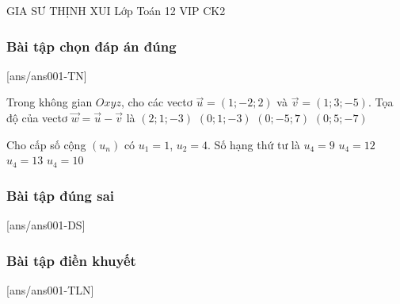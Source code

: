 
\def\toanlop{12}
\def\thoigian{50}
\def\namhoc{2025 - 2026}

\begin{dethi}
	{GIA SƯ THỊNH XUI}
	{Lớp Toán 12 VIP}
	{CK2}
\end{dethi}

\subsubsection{Bài tập chọn đáp án đúng}
\setcounter{ex}{0}
[ans/ans001-TN]

\begin{ex}%
	Trong không gian $Oxyz$, cho các vectơ $\vec{u}=(1;-2;2)$ và $\vec{v}=(1;3;-5)$. Tọa độ của vectơ $\vec{w}=\vec{u}-\vec{v}$ là
	\choice
	{$(2;1;-3)$}
	{$(0;1;-3)$}
	{\True $(0;-5;7)$}
	{$(0;5;-7)$}
\end{ex}

\begin{ex}%
	Cho cấp số cộng $(u_n)$ có $u_1=1$, $u_2=4$. Số hạng thứ tư là
	\choice
	{$u_4=9$}
	{$u_4=12$}
	{$u_4=13$}
	{\True $u_4=10$}
\end{ex}


\subsubsection{Bài tập đúng sai}
\setcounter{ex}{0}
[ans/ans001-DS]




\subsubsection{Bài tập điền khuyết}
\setcounter{ex}{0}
[ans/ans001-TLN]




\newpage
{}
\label{B\thedeso}

